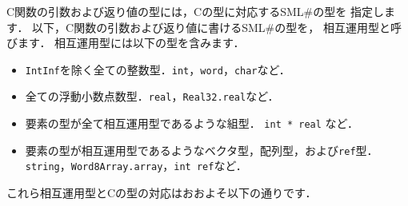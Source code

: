 \documentclass{jbook}
\newcommand{\smlsharp}{SML\#}
\begin{document}
	C関数の引数および返り値の型には，Cの型に対応する\smlsharp{}の型を
指定します．
	以下，C関数の引数および返り値に書ける\smlsharp{}の型を，
相互運用型と呼びます．
	相互運用型には以下の型を含みます．
\begin{itemize}
\item {\tt IntInf}を除く全ての整数型．{\tt int}，{\tt word}，{\tt char}など．
\item 全ての浮動小数点数型．{\tt real}，{\tt Real32.real}など．
\item 要素の型が全て相互運用型であるような組型．
	{\tt int * real} など．
\item 要素の型が相互運用型であるようなベクタ型，配列型，および{\tt ref}型．
	{\tt string}，{\tt Word8Array.array}，{\tt int ref}など．
\end{itemize}
	これら相互運用型とCの型の対応はおおよそ以下の通りです．
\end{document}
